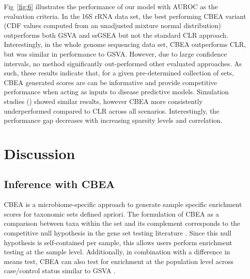 \documentclass[10pt,letterpaper]{article}
\begin{document}
Fig~\ref{fig:6} illustrates the performance of our model with AUROC as the evaluation criteria. In the 16S rRNA data set, the best performing CBEA variant (CDF values computed from an unadjusted mixture normal distribution) outperforms both GSVA and ssGSEA but not the standard CLR approach. Interestingly, in the whole genome sequencing data set, CBEA outperforms CLR, but was similar in performance to GSVA. However, due to large confidence intervals, no method significantly out-performed other evaluated approaches. As such, these results indicate that, for a given pre-determined collection of sets, CBEA generated scores are can be informative and provide competitive performance when acting as inputs to disease predictive models. Simulation studies () showed similar results, however CBEA more consistently underperformed compared to CLR across all scenarios. Interestingly, the performance gap decreases with increasing sparsity levels and correlation. 

\section*{Discussion}

\subsection*{Inference with CBEA} 
CBEA is a microbiome-specific approach to generate sample specific enrichment scores for taxonomic sets defined apriori. The formulation of CBEA as a comparison between taxa within the set and its complement corresponds to the competitive null hypothesis in the gene set testing literature \cite{tian2005}. Since this null hypothesis is self-contained per sample, this allows users perform enrichment testing at the sample level. Additionally, in combination with a difference in means test, CBEA can also test for enrichment at the population level across case/control status similar to GSVA \cite{hanzelmann2013}.  
\end{document}
